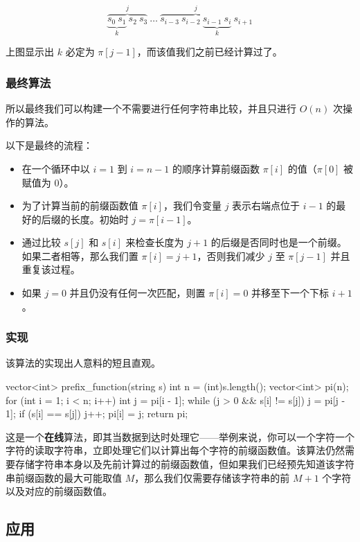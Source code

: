 $$
\overbrace{\underbrace{s_0 ~ s_1}_k ~ s_2 ~ s_3}^j ~ \dots ~ \overbrace{s_{i-3} ~ s_{i-2} ~ \underbrace{s_{i-1} ~ s_{i}}_k}^j ~s_{i+1}
$$

上图显示出 $k$ 必定为 $\pi[j - 1]$，而该值我们之前已经计算过了。

\subsubsection{最终算法}

所以最终我们可以构建一个不需要进行任何字符串比较，并且只进行 $O(n)$ 次操作的算法。

以下是最终的流程：

\begin{itemize}
\item 在一个循环中以 $i = 1$ 到 $i = n - 1$ 的顺序计算前缀函数 $\pi[i]$ 的值（$\pi[0]$ 被赋值为 $0$）。
\item 为了计算当前的前缀函数值 $\pi[i]$，我们令变量 $j$ 表示右端点位于 $i - 1$ 的最好的后缀的长度。初始时 $j = \pi[i - 1]$。
\item 通过比较 $s[j]$ 和 $s[i]$ 来检查长度为 $j + 1$ 的后缀是否同时也是一个前缀。如果二者相等，那么我们置 $\pi[i] = j + 1$，否则我们减少 $j$ 至 $\pi[j - 1]$ 并且重复该过程。
\item 如果 $j = 0$ 并且仍没有任何一次匹配，则置 $\pi[i] = 0$ 并移至下一个下标 $i + 1$。
\end{itemize}

\subsubsection{实现}

该算法的实现出人意料的短且直观。

\begin{cppcode}
vector<int> prefix_function(string s) {
  int n = (int)s.length();
  vector<int> pi(n);
  for (int i = 1; i < n; i++) {
    int j = pi[i - 1];
    while (j > 0 && s[i] != s[j]) j = pi[j - 1];
    if (s[i] == s[j]) j++;
    pi[i] = j;
  }
  return pi;
}
\end{cppcode}

这是一个\textbf{在线}算法，即其当数据到达时处理它——举例来说，你可以一个字符一个字符的读取字符串，立即处理它们以计算出每个字符的前缀函数值。该算法仍然需要存储字符串本身以及先前计算过的前缀函数值，但如果我们已经预先知道该字符串前缀函数的最大可能取值 $M$，那么我们仅需要存储该字符串的前 $M + 1$ 个字符以及对应的前缀函数值。

\subsection{应用}

